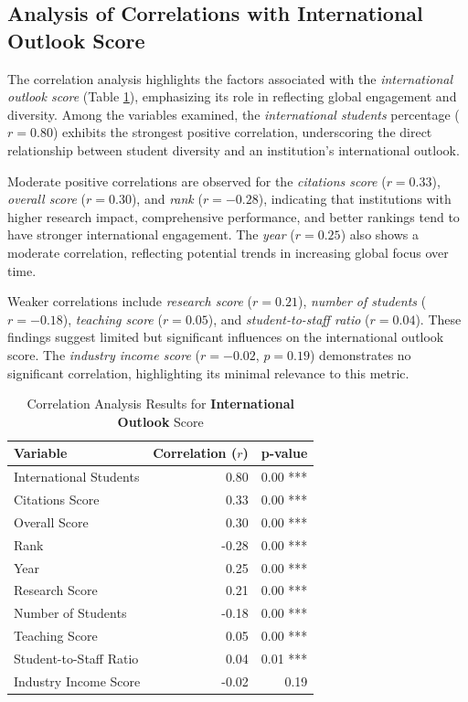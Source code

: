 \documentclass[conference]{IEEEtran}
\begin{document}
\subsection{Analysis of Correlations with International Outlook Score}

The correlation analysis highlights the factors associated with the \textit{international outlook score} (Table \ref{tab:correlation_international_outlook}), emphasizing its role in reflecting global engagement and diversity. Among the variables examined, the \textit{international students} percentage ($r = 0.80$) exhibits the strongest positive correlation, underscoring the direct relationship between student diversity and an institution's international outlook.

Moderate positive correlations are observed for the \textit{citations score} ($r = 0.33$), \textit{overall score} ($r = 0.30$), and \textit{rank} ($r = -0.28$), indicating that institutions with higher research impact, comprehensive performance, and better rankings tend to have stronger international engagement. The \textit{year} ($r = 0.25$) also shows a moderate correlation, reflecting potential trends in increasing global focus over time.

Weaker correlations include \textit{research score} ($r = 0.21$), \textit{number of students} ($r = -0.18$), \textit{teaching score} ($r = 0.05$), and \textit{student-to-staff ratio} ($r = 0.04$). These findings suggest limited but significant influences on the international outlook score. The \textit{industry income score} ($r = -0.02$, $p = 0.19$) demonstrates no significant correlation, highlighting its minimal relevance to this metric.

\begin{table}[h!]
	\centering
	\caption{Correlation Analysis Results for \textbf{International Outlook} Score}
	\label{tab:correlation_international_outlook}
	\begin{tabular}{|l|r|r|}
		\hline
		\textbf{Variable} & \textbf{Correlation ($r$)} & \textbf{p-value} \\
		\hline
		International Students & 0.80 & 0.00 *** \\
		Citations Score & 0.33 & 0.00 *** \\
		Overall Score & 0.30 & 0.00 *** \\
		Rank & -0.28 & 0.00 *** \\
		Year & 0.25 & 0.00 *** \\
		Research Score & 0.21 & 0.00 *** \\
		Number of Students & -0.18 & 0.00 *** \\
		Teaching Score & 0.05 & 0.00 *** \\
		Student-to-Staff Ratio & 0.04 & 0.01 *** \\
		Industry Income Score & -0.02 & 0.19 \\
		\hline
	\end{tabular}
\end{table}
\end{document}
